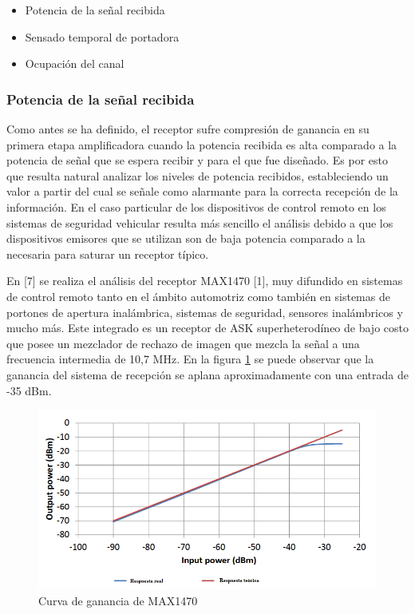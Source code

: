 \begin{itemize}
    \item Potencia de la señal recibida
    \item Sensado temporal de portadora
    \item Ocupación del canal

\end{itemize}

\subsubsection{Potencia de la señal recibida}

Como antes se ha definido, el receptor sufre compresión de ganancia en su primera etapa amplificadora cuando la potencia recibida es alta
comparado a la potencia de señal que se espera recibir y para el que fue diseñado. Es por esto que resulta natural analizar los niveles de
potencia recibidos, estableciendo un valor a partir del cual se señale como alarmante para la correcta recepción de la información. 
En el caso particular de los dispositivos de control remoto en los sistemas de seguridad vehicular resulta más sencillo el análisis 
debido a que los dispositivos emisores que se utilizan son de baja potencia comparado a la necesaria para saturar un receptor típico.\par
En [7] se realiza el análisis del receptor MAX1470 [1], muy difundido en sistemas de control remoto tanto en el ámbito automotriz como también
en sistemas de portones de apertura inalámbrica, sistemas de seguridad, sensores inalámbricos y mucho más. Este integrado es un receptor de 
ASK superheterodíneo de bajo costo que posee un mezclador de rechazo de imagen que mezcla la señal a una frecuencia intermedia de 10,7 MHz. En
la figura \ref{compresion_max} se puede observar que la ganancia del sistema de recepción se aplana aproximadamente con una entrada de -35 dBm.

\begin{figure}[htb]
	\centering
	\includegraphics[scale=0.5]{images/compresion_max.png}
    \caption{Curva de ganancia de MAX1470}
	\label{compresion_max}
\end{figure}


